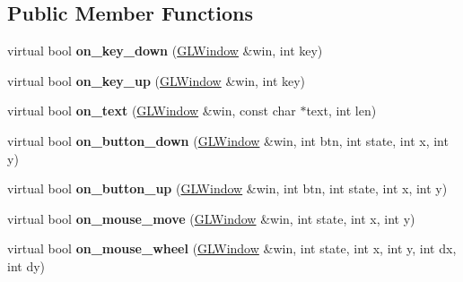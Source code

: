 \subsection*{Public Member Functions}
\begin{DoxyCompactItemize}
\item 
\mbox{\label{structglwindow_1_1_event_handler_a6f2084a1cbe2ec67360f07f7cacee5b8}} 
virtual bool {\bfseries on\+\_\+key\+\_\+down} (\hyperlink{classglwindow_1_1_g_l_window}{G\+L\+Window} \&win, int key)
\item 
\mbox{\label{structglwindow_1_1_event_handler_aed85ba8a37b8403ffe5d89ee5d2e765c}} 
virtual bool {\bfseries on\+\_\+key\+\_\+up} (\hyperlink{classglwindow_1_1_g_l_window}{G\+L\+Window} \&win, int key)
\item 
\mbox{\label{structglwindow_1_1_event_handler_a2dc8861119889a5ece73ffdb09439b18}} 
virtual bool {\bfseries on\+\_\+text} (\hyperlink{classglwindow_1_1_g_l_window}{G\+L\+Window} \&win, const char $\ast$text, int len)
\item 
\mbox{\label{structglwindow_1_1_event_handler_adeb34bb7c2eb4357496bf4d8fcda53df}} 
virtual bool {\bfseries on\+\_\+button\+\_\+down} (\hyperlink{classglwindow_1_1_g_l_window}{G\+L\+Window} \&win, int btn, int state, int x, int y)
\item 
\mbox{\label{structglwindow_1_1_event_handler_a2801b252ae6ddc96595bc262354ca789}} 
virtual bool {\bfseries on\+\_\+button\+\_\+up} (\hyperlink{classglwindow_1_1_g_l_window}{G\+L\+Window} \&win, int btn, int state, int x, int y)
\item 
\mbox{\label{structglwindow_1_1_event_handler_a5f016ad6546c1413845a1a3b6c66bad9}} 
virtual bool {\bfseries on\+\_\+mouse\+\_\+move} (\hyperlink{classglwindow_1_1_g_l_window}{G\+L\+Window} \&win, int state, int x, int y)
\item 
\mbox{\label{structglwindow_1_1_event_handler_ad6373a3f3dd084db5f100e4da12130b8}} 
virtual bool {\bfseries on\+\_\+mouse\+\_\+wheel} (\hyperlink{classglwindow_1_1_g_l_window}{G\+L\+Window} \&win, int state, int x, int y, int dx, int dy)

\end{DoxyCompactItemize}
